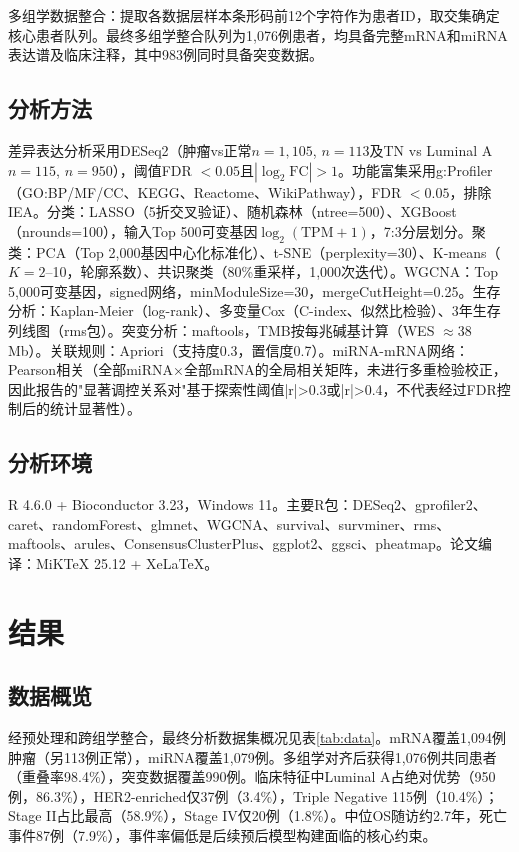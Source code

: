 \documentclass[12pt,a4paper,openany]{ctexbook}
\begin{document}
多组学数据整合：提取各数据层样本条形码前12个字符作为患者ID，取交集确定核心患者队列。最终多组学整合队列为1,076例患者，均具备完整mRNA和miRNA表达谱及临床注释，其中983例同时具备突变数据。

\section{分析方法}
差异表达分析采用DESeq2\cite{love2014moderated}（肿瘤vs正常$n=1,105$, $n=113$及TN vs Luminal A $n=115$, $n=950$），阈值FDR $<0.05$且$|\log_2\text{FC}|>1$。功能富集采用g:Profiler\cite{kolberg2023gprofiler}（GO:BP/MF/CC、KEGG、Reactome、WikiPathway），FDR $<0.05$，排除IEA。分类：LASSO（5折交叉验证）、随机森林（ntree=500）、XGBoost（nrounds=100），输入Top 500可变基因$\log_2(\text{TPM}+1)$，7:3分层划分。聚类：PCA（Top 2,000基因中心化标准化）、t-SNE（perplexity=30）、K-means（$K=2$--10，轮廓系数）、共识聚类\cite{wilkerson2010consensus}（80\%重采样，1,000次迭代）。WGCNA\cite{langfelder2008wgcna}：Top 5,000可变基因，signed网络，minModuleSize=30，mergeCutHeight=0.25。生存分析：Kaplan-Meier（log-rank）、多变量Cox（C-index、似然比检验）、3年生存列线图（rms包）。突变分析：maftools\cite{mayakonda2018maftools}，TMB按每兆碱基计算（WES $\approx$38 Mb）。关联规则：Apriori（支持度0.3，置信度0.7）。miRNA-mRNA网络：Pearson相关（全部miRNA×全部mRNA的全局相关矩阵，未进行多重检验校正，因此报告的"显著调控关系对"基于探索性阈值|r|>0.3或|r|>0.4，不代表经过FDR控制后的统计显著性）。

\section{分析环境}
R 4.6.0 + Bioconductor 3.23，Windows 11。主要R包：DESeq2、gprofiler2、caret、randomForest、glmnet、WGCNA、survival、survminer、rms、maftools、arules、ConsensusClusterPlus、ggplot2、ggsci、pheatmap。论文编译：MiKTeX 25.12 + XeLaTeX。

\chapter{结果}

\section{数据概览}
经预处理和跨组学整合，最终分析数据集概况见表\ref{tab:data}。mRNA覆盖1,094例肿瘤（另113例正常），miRNA覆盖1,079例。多组学对齐后获得1,076例共同患者（重叠率98.4\%），突变数据覆盖990例。临床特征中Luminal A占绝对优势（950例，86.3\%），HER2-enriched仅37例（3.4\%），Triple Negative 115例（10.4\%）；Stage II占比最高（58.9\%），Stage IV仅20例（1.8\%）。中位OS随访约2.7年，死亡事件87例（7.9\%），事件率偏低是后续预后模型构建面临的核心约束。
\end{document}
